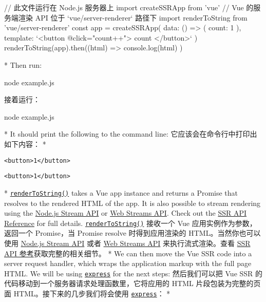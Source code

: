 \begin{paracol}{2}
\begin{codeJs}
// 此文件运行在 Node.js 服务器上
import { createSSRApp } from 'vue'
// Vue 的服务端渲染 API 位于 `vue/server-renderer` 路径下
import { renderToString } from 'vue/server-renderer'
const app = createSSRApp({
  data: () => ({ count: 1 }),
  template: `<button @click="count++">{{ count }}</button>`
})
renderToString(app).then((html) => {
  console.log(html)
})
\end{codeJs}
\switchcolumn[0]*%
Then run:
\begin{codeShell}
node example.js
\end{codeShell}  
\switchcolumn
接着运行：
\begin{codeShell}
node example.js
\end{codeShell}  
\switchcolumn[0]*%
It should print the following to the command line:
\switchcolumn
它应该会在命令行中打印出如下内容：
\switchcolumn[0]*%
\begin{verbatim}
<button>1</button>
\end{verbatim}
\switchcolumn
\begin{verbatim}
<button>1</button>
\end{verbatim}
\switchcolumn[0]*%
\href{https://vuejs.org/api/ssr.html\#rendertostring}{\texttt{renderToString()}}
takes a Vue app instance and returns a Promise that resolves to the
rendered HTML of the app. It is also possible to stream rendering using
the \href{https://nodejs.org/api/stream.html}{Node.js Stream API} or
\href{https://developer.mozilla.org/en-US/docs/Web/API/Streams_API}{Web
Streams API}. Check out the \href{https://vuejs.org/api/ssr.html}{SSR
API Reference} for full details.
\switchcolumn
\href{https://cn.vuejs.org/api/ssr.html\#rendertostring}{\texttt{renderToString()}}
接收一个 Vue 应用实例作为参数，返回一个 Promise，当 Promise resolve
时得到应用渲染的 HTML。当然你也可以使用
\href{https://nodejs.org/api/stream.html}{Node.js Stream API} 或者
\href{https://developer.mozilla.org/zh-CN/docs/Web/API/Streams_API}{Web
Streams API} 来执行流式渲染。查看
\href{https://cn.vuejs.org/api/ssr.html}{SSR API
参考}获取完整的相关细节。
\switchcolumn[0]*%
We can then move the Vue SSR code into a server request handler, which
wraps the application markup with the full page HTML. We will be using
\href{https://expressjs.com/}{\texttt{express}} for the next steps:
\switchcolumn
然后我们可以把 Vue SSR 的代码移动到一个服务器请求处理函数里，它将应用的
HTML 片段包装为完整的页面 HTML。接下来的几步我们将会使用
\href{https://expressjs.com/}{\texttt{express}}：
\switchcolumn[0]*%
\begin{itemize}

\end{itemize}
\end{paracol}
